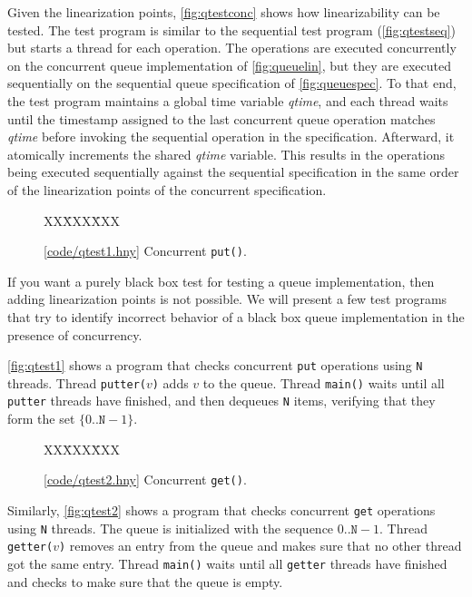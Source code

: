 \documentclass{report}
\newcommand{\harmonysource}[1]{
\begin{tabbing}
XX\=XXX\=XXX\kill
    
\end{tabbing}
}
\newcommand{\harmonylink}[1]{%
[\href{https://harmony.cs.cornell.edu/#1}{\underline{#1}}]%
}
\newenvironment{code}{
\tcolorbox
}{
\endtcolorbox
}
\begin{document}
Given the linearization points, \autoref{fig:qtestconc} shows how
linearizability can be tested.
The test program is similar to the sequential test program
(\autoref{fig:qtestseq}) but starts a thread for each operation.
The operations are executed concurrently on the concurrent queue
implementation of \autoref{fig:queuelin}, but they are executed sequentially
on the sequential queue specification of \autoref{fig:queuespec}.
To that end, the test program maintains a global time variable
\textit{qtime}, and each thread waits until the timestamp assigned to
the last concurrent queue operation matches \textit{qtime} before invoking
the sequential operation in the specification.
Afterward, it atomically increments the shared \textit{qtime} variable.
This results in the operations being executed sequentially against the
sequential specification in the same order of the linearization points
of the concurrent specification.

\begin{figure}
\begin{code}
\harmonysource{qtest1}
\end{code}
\caption{\harmonylink{code/qtest1.hny} Concurrent \texttt{put()}.}
\label{fig:qtest1}
\end{figure}

If you want a purely black box test for testing a queue implementation,
then adding linearization points is not possible.
We will present a few test
programs that try to identify incorrect behavior of
a black box queue implementation in the presence of concurrency.

\autoref{fig:qtest1} shows a program that
checks concurrent \texttt{put} operations using
\texttt{N} threads.  Thread \texttt{putter($v$)}
adds $v$ to the queue.
Thread \texttt{main()} waits until all \texttt{putter}
threads have finished, and then dequeues \texttt{N}
items, verifying that they form the set
$\{ 0 .. \mathtt{N} - 1 \}$.

\begin{figure}
\begin{code}
\harmonysource{qtest2}
\end{code}
\caption{\harmonylink{code/qtest2.hny} Concurrent \texttt{get()}.}
\label{fig:qtest2}
\end{figure}

Similarly, \autoref{fig:qtest2} shows a program that
checks concurrent \texttt{get} operations using
\texttt{N} threads.
The queue is initialized with the sequence
$0 .. \mathtt{N} - 1$.
Thread \texttt{getter($v$)} removes an entry from the
queue and makes sure that no other thread got the
same entry.
Thread \texttt{main()} waits until all \texttt{getter}
threads have finished and checks to make sure that
the queue is empty.
\end{document}
